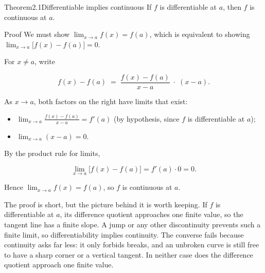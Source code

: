 \documentclass[a4paper,12pt,oneside]{memoir}
\begin{document}
\begin{envtheorem}{Theorem}{2.1}{Differentiable implies continuous}
If \(f\) is differentiable at \(a\), then \(f\) is continuous at \(a\).
\end{envtheorem}
\begin{envproof}{Proof}{}{}
We must show \(\displaystyle\lim_{x \to a} f(x) = f(a)\), which is equivalent to showing \(\displaystyle\lim_{x \to a} \bigl[f(x) - f(a)\bigr] = 0\).

For \(x \ne a\), write

\[ f(x) - f(a) \;=\; \frac{f(x) - f(a)}{x - a} \;\cdot\; (x - a). \]

As \(x \to a\), both factors on the right have limits that exist:

\begin{itemize}
  \item \(\displaystyle\lim_{x \to a} \frac{f(x) - f(a)}{x - a} = f'(a)\) (by hypothesis, since \(f\) is differentiable at \(a\));
  \item \(\displaystyle\lim_{x \to a} (x - a) = 0\).
\end{itemize}
By the product rule for limits,

\[ \lim_{x \to a} \bigl[f(x) - f(a)\bigr] = f'(a) \cdot 0 = 0. \]

Hence \(\lim_{x \to a} f(x) = f(a)\), so \(f\) is continuous at \(a\).
\end{envproof}
The proof is short, but the picture behind it is worth keeping. If \(f\) is differentiable at \(a\), its difference quotient approaches one finite value, so the tangent line has a finite slope. A jump or any other discontinuity prevents such a finite limit, so differentiability implies continuity. The converse fails because continuity asks far less: it only forbids breaks, and an unbroken curve is still free to have a sharp corner or a vertical tangent. In neither case does the difference quotient approach one finite value.
\end{document}
